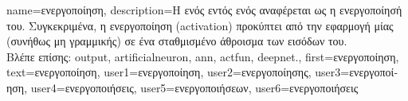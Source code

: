 {name={\foreignlanguage{greek}{ενεργοποίηση}},
	description={\foreignlanguage{greek}{Η}  \foreignlanguage{greek}{ενός} 
		 \foreignlanguage{greek}{εντός ενός}  
		\foreignlanguage{greek}{αναφέρεται ως η ενεργοποίησή του. Συγκεκριμένα, η ενεργοποίηση} (activation) 
		\foreignlanguage{greek}{προκύπτει από την εφαρμογή μίας (συνήθως μη γραμμικής)} 
	 	 \foreignlanguage{greek}{σε ένα σταθμισμένο άθροισμα των εισόδων του.} 
		\\
		\foreignlanguage{greek}{Βλέπε επίσης:} \gls{output}, \gls{artificialneuron}, \gls{ann}, \gls{actfun}, \gls{deepnet}.}, 
	first={\foreignlanguage{greek}{ενεργοποίηση}},
	text={\foreignlanguage{greek}{ενεργοποίηση}},
	user1={\foreignlanguage{greek}{ενεργοποίηση}}, %
	user2={\foreignlanguage{greek}{ενεργοποίησης}}, %
	user3={\foreignlanguage{greek}{ενεργοποίηση}}, %
	user4={\foreignlanguage{greek}{ενεργοποιήσεις}}, %
	user5={\foreignlanguage{greek}{ενεργοποιήσεων}}, %
	user6={\foreignlanguage{greek}{ενεργοποιήσεις}} %
}

